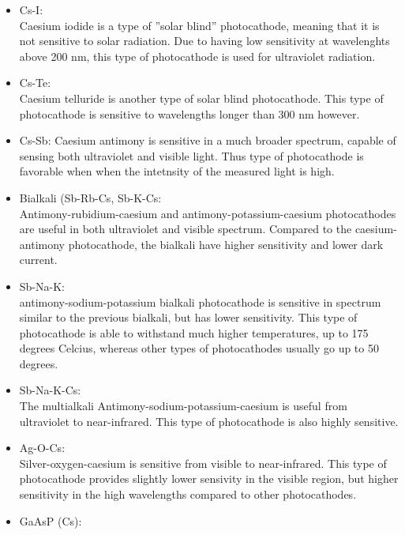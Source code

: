 \begin{itemize}

\item Cs-I:\\
Caesium iodide is a type of ”solar blind” photocathode, meaning that it is not sensitive to solar radiation. Due to having low sensitivity at wavelenghts above 200 nm, this type of photocathode is used for ultraviolet radiation. 
\\
\item Cs-Te:\\
Caesium telluride is another type of solar blind photocathode. This type of photocathode is sensitive to wavelengths longer than 300 nm however.
\\
\item Cs-Sb:
Caesium antimony is sensitive in a much broader spectrum, capable of sensing both ultraviolet and visible light. Thus type of photocathode is favorable when when the intetnsity of the measured light is high.
\\
\item Bialkali (Sb-Rb-Cs, Sb-K-Cs:\\ 
Antimony-rubidium-caesium and antimony-potassium-caesium photocathodes are useful in both ultraviolet and visible spectrum. Compared to the caesium-antimony photocathode, the bialkali have higher sensitivity and lower dark current.
\\
\item Sb-Na-K:\\
antimony-sodium-potassium bialkali photocathode is sensitive in spectrum similar to the previous bialkali, but has lower sensitivity. This type of photocathode is able to withstand much higher temperatures, up to 175 degrees Celcius, whereas other types of photocathodes usually go up to 50 degrees.
\\
\item Sb-Na-K-Cs:\\
The multialkali Antimony-sodium-potassium-caesium is useful from ultraviolet to near-infrared. This type of photocathode is also highly sensitive.
\\
\item Ag-O-Cs:\\ 
Silver-oxygen-caesium is sensitive from visible to near-infrared. This type of photocathode provides slightly lower sensivity in the visible region, but higher sensitivity in the high wavelengths compared to other photocathodes.
\\
\item GaAsP (Cs):\\

\end{itemize}
